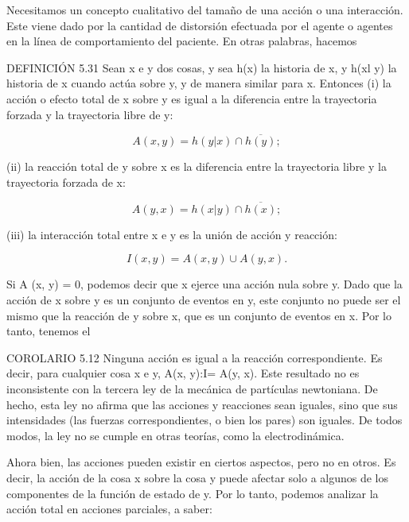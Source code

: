 \begin{justifying}
    \bigskip

    Necesitamos un concepto cualitativo del tamaño de una acción o una interacción. Este viene dado por la cantidad de distorsión efectuada por el
    agente o agentes en la línea de comportamiento del paciente. En otras palabras, hacemos
    
    DEFINICIÓN 5.31 Sean x e y dos cosas, y sea h(x) la historia
    de x, y h(xl y) la historia de x cuando actúa sobre y, y de manera similar para
    x. Entonces
    (i) la acción o efecto total de x sobre y es igual a la diferencia entre
    la trayectoria forzada y la trayectoria libre de y:

    \begin{center}
        $$ A(x, y) = h(y|x) \cap \overline{h(y)}; $$
    \end{center}

    (ii) la reacción total de y sobre x es la diferencia entre la trayectoria libre
    y la trayectoria forzada de x:

    \begin{center}
        $$ A(y, x) = h(x|y) \cap \overline{h(x)}; $$
    \end{center}

    (iii) la interacción total entre x e y es la unión de acción y
    reacción:

    \begin{center}
        $$ I(x, y) = A(x, y) \cup A(y, x). $$
    \end{center}

    Si A (x, y) = 0, podemos decir que x ejerce una acción nula sobre y.
    Dado que la acción de x sobre y es un conjunto de eventos en y, este conjunto no puede ser el
    mismo que la reacción de y sobre x, que es un conjunto de eventos en x. Por lo tanto, tenemos
    el

    \noindent COROLARIO 5.12 Ninguna acción es igual a la reacción correspondiente. Es decir, para
    cualquier cosa x e y, A(x, y):I= A(y, x).
    Este resultado no es inconsistente con la tercera ley de la mecánica de partículas newtoniana.
    De hecho, esta ley no afirma que las acciones y reacciones sean
    iguales, sino que sus intensidades (las fuerzas correspondientes, o bien
    los pares) son iguales. De todos modos, la ley no se cumple en otras teorías, como
    la electrodinámica.

    Ahora bien, las acciones pueden existir en ciertos aspectos, pero no en otros. Es decir,
    la acción de la cosa x sobre la cosa y puede afectar solo a algunos de los
    componentes de la función de estado de y. Por lo tanto, podemos analizar la acción total
    en acciones parciales, a saber: 


\end{justifying}
